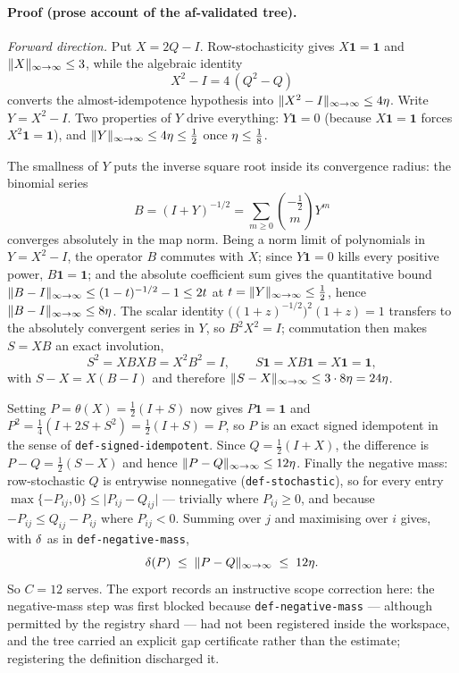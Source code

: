 \paragraph{Proof (prose account of the af-validated tree).}
\emph{Forward direction.} Put $X=2Q-I$. Row-stochasticity gives $X\mathbf1=\mathbf1$ and
$\lVert X \rVert_{\infty\to\infty}\le3$, while the algebraic identity
\begin{equation}\label{eq:ce-square}
  X^2-I=4\,(Q^2-Q)
\end{equation}
converts the almost-idempotence hypothesis into $\lVert X^2-I \rVert_{\infty\to\infty}\le4\eta$. Write
$Y=X^2-I$. Two properties of $Y$ drive everything: $Y\mathbf1=0$ (because
$X\mathbf1=\mathbf1$ forces $X^2\mathbf1=\mathbf1$), and $\lVert Y \rVert_{\infty\to\infty}\le4\eta\le\tfrac12$
once $\eta\le\tfrac18$.

The smallness of $Y$ puts the inverse square root inside its convergence radius: the
binomial series
\[
  B=(I+Y)^{-1/2}=\sum_{m\ge0}\binom{-\tfrac12}{m}Y^{m}
\]
converges absolutely in the map norm. Being a norm limit of polynomials in $Y=X^2-I$, the
operator $B$ commutes with $X$; since $Y\mathbf1=0$ kills every positive power,
$B\mathbf1=\mathbf1$; and the absolute coefficient sum gives the quantitative bound
$\lVert B-I \rVert_{\infty\to\infty}\le(1-t)^{-1/2}-1\le 2t$ at $t=\lVert Y \rVert_{\infty\to\infty}\le\tfrac12$, hence
$\lVert B-I \rVert_{\infty\to\infty}\le8\eta$. The scalar identity $\bigl((1+z)^{-1/2}\bigr)^2(1+z)=1$
transfers to the absolutely convergent series in $Y$, so $B^2X^2=I$; commutation then
makes $S=XB$ an exact involution,
\[
  S^2=XBXB=X^2B^2=I,\qquad S\mathbf1=XB\mathbf1=X\mathbf1=\mathbf1,
\]
with $S-X=X(B-I)$ and therefore $\lVert S-X \rVert_{\infty\to\infty}\le3\cdot8\eta=24\eta$.

Setting $P=\theta(X)=\tfrac12(I+S)$ now gives $P\mathbf1=\mathbf1$ and
$P^2=\tfrac14(I+2S+S^2)=\tfrac12(I+S)=P$, so $P$ is an exact signed idempotent in the
sense of \texttt{def-signed-idempotent}. Since $Q=\tfrac12(I+X)$, the difference is
$P-Q=\tfrac12(S-X)$ and hence $\lVert P-Q \rVert_{\infty\to\infty}\le12\eta$. Finally the negative mass:
row-stochastic $Q$ is entrywise nonnegative (\texttt{def-stochastic}), so for every entry
$\max\{-P_{ij},0\}\le\lvert P_{ij}-Q_{ij}\rvert$ --- trivially where $P_{ij}\ge0$, and
because $-P_{ij}\le Q_{ij}-P_{ij}$ where $P_{ij}<0$. Summing over $j$ and maximising over
$i$ gives, with $\delta$ as in \texttt{def-negative-mass},
\begin{equation}\label{eq:ce-negmass}
  \delta(P)\;\le\;\lVert P-Q \rVert_{\infty\to\infty}\;\le\;12\eta .
\end{equation}
So $C=12$ serves. The export records an instructive scope correction here: the
negative-mass step was first blocked because \texttt{def-negative-mass} --- although
permitted by the registry shard --- had not been registered inside the workspace, and the
tree carried an explicit gap certificate rather than the estimate; registering the
definition discharged it.

